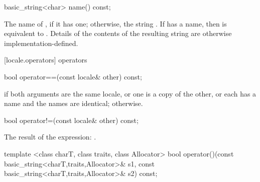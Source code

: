 %
%
\begin{itemdecl}
basic_string<char> name() const;
\end{itemdecl}

\begin{itemdescr}
\pnum
\returns
The name of
,
if it has one; otherwise, the string .
If
has a name, then
is equivalent to
.
Details of the contents of the resulting string are otherwise implementation-defined.%
\end{itemdescr}

[locale.operators]{ operators}

%
%
\begin{itemdecl}
bool operator==(const locale& other) const;
\end{itemdecl}

\begin{itemdescr}
\pnum
\returns
{}
if both arguments are the same locale, or one is a copy of the
other, or each has a name and the names are identical;
otherwise.
\end{itemdescr}

%
%
\begin{itemdecl}
bool operator!=(const locale& other) const;
\end{itemdecl}

\begin{itemdescr}
\pnum
\returns
The result of the expression:
.
\end{itemdescr}

%
%
\begin{itemdecl}
template <class charT, class traits, class Allocator>
  bool operator()(const basic_string<charT,traits,Allocator>& s1,
                  const basic_string<charT,traits,Allocator>& s2) const;
\end{itemdecl}

